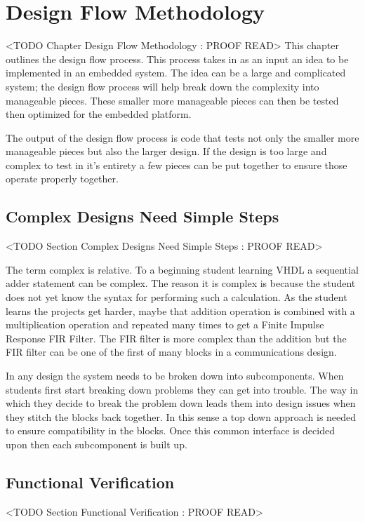 \chapter{Design Flow Methodology}
	<TODO Chapter Design Flow Methodology : PROOF READ>
This chapter outlines the design flow process. This process takes in as an input an idea to be implemented in an embedded system. The idea can be a large and complicated system; the design flow process will help break down the complexity into manageable pieces. These smaller more manageable pieces can then be tested then optimized for the embedded platform. 

The output of the design flow process is code that tests not only the smaller more manageable pieces but also the larger design. If the design is too large and complex to test in it's entirety a few pieces can be put together to ensure those operate properly together. 

\section{Complex Designs Need Simple Steps}
	<TODO Section Complex Designs Need Simple Steps : PROOF READ>

The term complex is relative. To a beginning student learning VHDL a sequential adder statement can be complex. The reason it is complex is because the student does not yet know the syntax for performing such a calculation. As the student learns the projects get harder, maybe that addition operation is combined with a multiplication operation and repeated many times to get a Finite Impulse Response \ac{FIR} Filter.  The FIR filter is more complex than the addition but the FIR filter can be one of the first of many blocks in a communications design. 

In any design the system needs to be broken down into subcomponents. When students first start breaking down problems they can get into trouble. The way in which they decide to break the problem down leads them into design issues when they stitch the blocks back together. In this sense a top down approach is needed to ensure compatibility in the blocks. Once this common interface is decided upon then each subcomponent is built up.
	
\section{Functional Verification}
	<TODO Section Functional Verification : PROOF READ>

